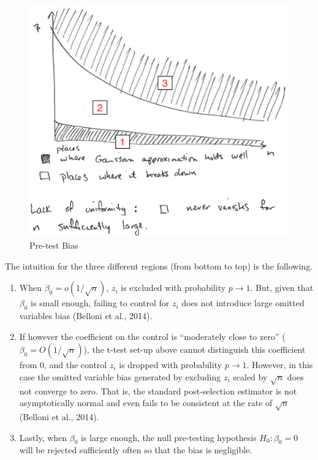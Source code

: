 \documentclass[12pt,]{book}
\providecommand{\tightlist}{%
  \setlength{\itemsep}{0pt}\setlength{\parskip}{0pt}}
\begin{document}
\begin{figure}
\centering
\includegraphics{figures/Fig_623.png}
\caption{Pre-test Bias}
\end{figure}

The intuition for the three different regions (from bottom to top) is the following.

\begin{enumerate}
\def\labelenumi{\arabic{enumi}.}
\tightlist
\item
  When \(\beta_0 = o(1/\sqrt{n})\), \(z_i\) is excluded with probability \(p \to 1\). But, given that \(\beta_0\) is small enough, failing to control for \(z_i\) does not introduce large omitted variables bias (Belloni et al., 2014).
\item
  If however the coefficient on the control is ``moderately close to zero'' (\(\beta_0 = O(1/\sqrt{n})\)), the t-test set-up above cannot distinguish this coefficient from \(0\), and the control \(z_i\) is dropped with probability \(p \to 1\). However, in this case the omitted variable bias generated by excluding \(z_i\) scaled by \(\sqrt{n}\) does not converge to zero. That is, the standard post-selection estimator is not asymptotically normal and even fails to be consistent at the rate of \(\sqrt{n}\) (Belloni et al., 2014).
\item
  Lastly, when \(\beta_0\) is large enough, the null pre-testing hypothesis \(H_0 : \beta_0 = 0\) will be rejected sufficiently often so that the bias is negligible.
\end{enumerate}
\end{document}
